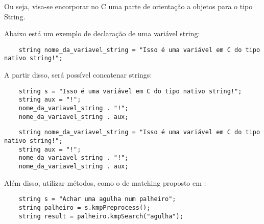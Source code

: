\documentclass[12pt]{article}
\begin{document}
Ou seja, visa-se encorporar no C uma parte de orientação a objetos para o tipo String. 


Abaixo está um exemplo de declaração de uma variável string:

\begin{verbatim}
	string nome_da_variavel_string = "Isso é uma variável em C do tipo nativo string!";
\end{verbatim}

A partir disso, será possível concatenar strings:
\begin{verbatim}
	string s = "Isso é uma variável em C do tipo nativo string!";
	string aux = "!";
	nome_da_variavel_string . "!";
	nome_da_variavel_string . aux;
\end{verbatim}

\begin{verbatim}
	string nome_da_variavel_string = "Isso é uma variável em C do tipo nativo string!";
	string aux = "!";
	nome_da_variavel_string . "!";
	nome_da_variavel_string . aux;
\end{verbatim}

Além disso, utilizar métodos, como o de matching proposto em \cite{clrs09}:
\begin{verbatim}
	string s = "Achar uma agulha num palheiro";
	string palheiro = s.kmpPreprocess();
	string result = palheiro.kmpSearch("agulha");
\end{verbatim}






\end{document}
